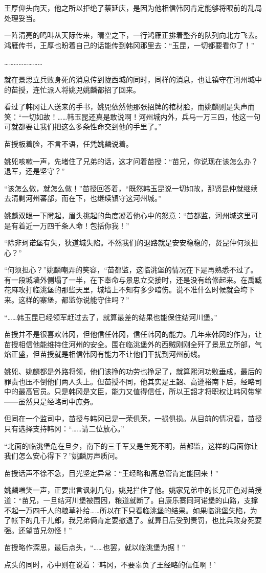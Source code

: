 王厚仰头向天，他之所以拒绝了蔡延庆，是因为他相信韩冈肯定能够将眼前的乱局处理妥当。

一阵清亮的鸣叫从天际传来，晴空之下，一行鸿雁正排着整齐的队列向北方飞去。鸿雁传书，王厚也盼着自己的话能传到韩冈那里去：“玉昆，一切都要看你了！”

……………………

就在景思立兵败身死的消息传到陇西城的同时，同样的消息，也让镇守在河州城中的苗授，连忙派人将姚兕姚麟都招了回来。

看过了韩冈让人送来的手书，姚兕依然他那张招牌的棺材脸，而姚麟则是失声而笑：“一切如故！……韩玉昆还真是敢说啊！河州城内外，兵马一万三四，他这一句可就都要让我们把这么多条性命交到他的手里了。”

苗授板着脸，不言不语，任凭姚麟说着。

姚兕咳嗽一声，先堵住了兄弟的话，这才问着苗授：“苗兄，你说现在该怎么办？退军，还是坚守？”

“该怎么做，就怎么做！”苗授回答着，“既然韩玉昆说一切如故，那贤昆仲就继续去清剿河州蕃部，而在下，也继续镇守这河州城。”

姚麟双眼一下瞪起，眉头挑起的角度凝着他心中的怒意：“苗都监，河州城这里可是有着近一万四千条人命！包括你我！”

“除非珂诺堡有失，狄道城失陷。不然我们的退路就是安安稳稳的，贤昆仲何须担心？”

“何须担心？”姚麟嘲弄的笑容，“苗都监，这临洮堡的情况在下是再熟悉不过了。有一段城墙外侧塌了一半，在下奉命与景思立交接时，还是没有给修起来。在禹臧花麻攻打临洮堡的那些天里，城墙上不知有多少暗伤。说不准什么时候就会垮下来。这样的寨堡，都监你说能守住吗？”

“……韩玉昆已经领军赶过去了，就算最差的结果也能保住结河川堡。”

苗授并不是很喜欢韩冈，但他信任韩冈，信任韩冈的能力。几年来韩冈的作为，让苗授相信他能维持住河州的安全。围在临洮堡外的西贼刚刚全歼了景思立所部，气焰正盛，但苗授就是相信韩冈有能力不让他们干扰到河州前线。

姚兕、姚麟都是外路将领，他们该挣的功劳也挣足了，就算熙河功败垂成，最后的罪责也压不倒他们两人头上。但苗授不同，他其实是王韶、高遵裕南下后，经略司中的最高官员。只是韩冈是文臣，能力又值得信任，所以王韶才将职权让韩冈带掌——虽然只是经略司中庶务。

但同在一个监司中，苗授与韩冈已是一荣俱荣，一损俱损。从目前的情况看，苗授只有选择支持韩冈：“……请二位放心。”

“北面的临洮堡危在旦夕，南下的三千军又是生死不明，苗都监，这样的局面你让我们怎么安心得下？”姚麟厉声质问。

苗授话声不徐不急，目光坚定异常：“王经略和高总管肯定能回来！”

姚麟嗤笑一声，正要出言讽刺几句，姚兕拦住了他。姚家兄弟中的长兄正色对苗授道：“苗兄，一旦结河川堡被围困，粮道就断了。自康乐寨同珂诺堡的山路，支撑不起一万四千人的粮草补给……所以在下只看临洮堡的结果。如果临洮堡失陷，为了帐下的几千儿郎，我兄弟俩肯定要撤退了。就算日后受到责罚，也比兵败身死要强。还望苗兄勿怪！”

苗授略作深思，最后点头，“……也罢，就以临洮堡为据！”

点头的同时，心中则在说着：‘韩冈，不要辜负了王经略的信任啊！’

